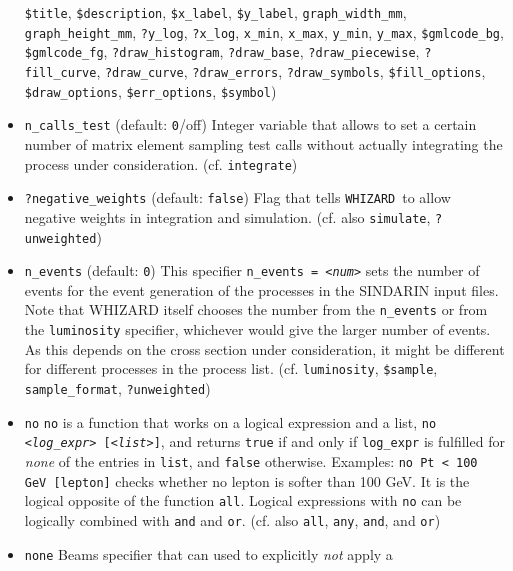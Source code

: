 \documentclass[12pt]{book}
\newcommand{\ttt}[1]{\texttt{#1}}
\newcommand{\whizard}{\texttt{WHIZARD}}
\begin{document}
\begin{itemize}
\ttt{\$title}, \ttt{\$description}, \ttt{\$x\_label},
\ttt{\$y\_label}, \ttt{graph\_width\_mm}, \ttt{graph\_height\_mm},
\ttt{?y\_log}, \ttt{?x\_log}, \ttt{x\_min}, \ttt{x\_max},
\ttt{y\_min}, \ttt{y\_max}, \ttt{\$gmlcode\_bg}, \ttt{\$gmlcode\_fg},
\ttt{?draw\_histogram}, \ttt{?draw\_base}, \ttt{?draw\_piecewise},
\ttt{?fill\_curve}, \ttt{?draw\_curve}, \ttt{?draw\_errors},
\ttt{?draw\_symbols}, \newline \ttt{\$fill\_options}, \ttt{\$draw\_options},
\ttt{\$err\_options}, \ttt{\$symbol})
\item
\ttt{n\_calls\_test} \qquad (default: \ttt{0}/off) \newline
Integer variable that allows to set a certain number of matrix element
sampling test calls without actually integrating the process under
consideration. (cf. \ttt{integrate})
\item
\ttt{?negative\_weights} \qquad (default: \ttt{false}) \newline
Flag that tells \whizard\ to allow negative weights in integration and
simulation. (cf. also \ttt{simulate}, \ttt{?unweighted})
\item
\ttt{n\_events} \qquad (default: \ttt{0}) \newline
This specifier \ttt{n\_events = {\em <num>}} sets the number of events
for the event generation of the processes in the SINDARIN input
files. Note that WHIZARD itself chooses the number from the
\ttt{n\_events} or from the \ttt{luminosity} specifier, whichever
would give the larger number of events. As this depends on the cross
section under consideration, it might be different for different
processes in the process list.  (cf. \ttt{luminosity}, \ttt{\$sample},
\ttt{sample\_format}, \ttt{?unweighted}) 
\item
\ttt{no} \newline
\ttt{no} is a function that works on a logical expression and a list, 
\ttt{no {\em <log\_expr>} [{\em <list>}]}, and returns \ttt{true} if and only if
\ttt{log\_expr} is fulfilled for {\em none} of the entries in
\ttt{list}, and \ttt{false} otherwise. Examples: \ttt{no Pt < 100 GeV
  [lepton]} checks whether no lepton is softer than 100 GeV. It is the
logical opposite of the function \ttt{all}. Logical expressions with
\ttt{no} can be logically combined with \ttt{and} and
\ttt{or}. (cf. also \ttt{all}, \ttt{any}, \ttt{and}, and \ttt{or}) 
\item
\ttt{none} \newline
Beams specifier that can used to explicitly {\em not} apply a

\end{itemize}
\end{document}

